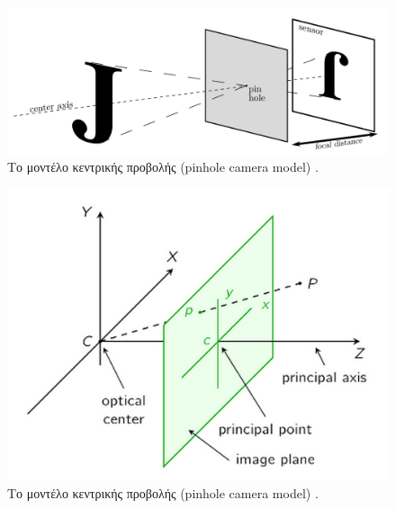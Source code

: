 \begin{figure}[H]
    \centering
    \includegraphics[scale=0.5, angle=0]{Files/Figures/pinhole3.png}
    \caption[Το μοντέλο κεντρικής προβολής (pinhole camera model)]{ Το μοντέλο κεντρικής προβολής (pinhole camera model) \cite{pinhole} .}
    \label{fig:pinhole3}
\end{figure}

\begin{figure}[H]
    \centering
    \includegraphics[scale=0.5, angle=0]{Files/Figures/pinhole1.png}
    \caption[Το μοντέλο κεντρικής προβολής στις 3 διαστάσεις (pinhole camera model)]{ Το μοντέλο κεντρικής προβολής (pinhole camera model) \cite{pinhole} .}
    \label{fig:pinhole1}
\end{figure}

